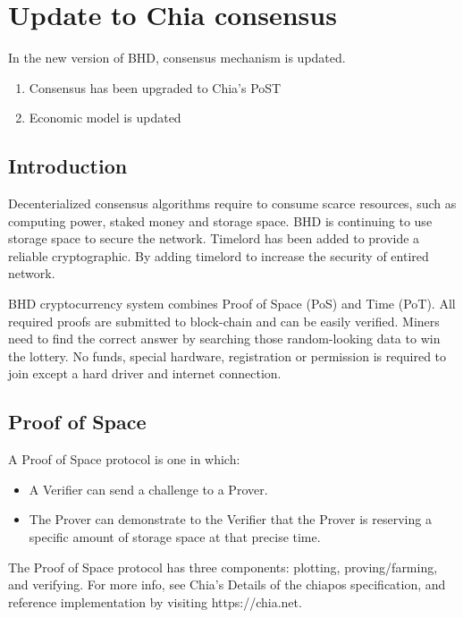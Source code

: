 \chapter{Update to Chia consensus}
\begin{flushleft}
    In the new version of BHD, consensus mechanism is updated.
    \begin{enumerate}
        \item Consensus has been upgraded to Chia's PoST
        \item Economic model is updated
    \end{enumerate}
\end{flushleft}
\section{Introduction}
\begin{flushleft}
    Decenterialized consensus algorithms require to consume scarce resources, such as computing power, staked money and storage space. BHD is continuing to use storage space to secure the network. Timelord has been added to provide a reliable cryptographic. By adding timelord to increase the security of entired network.
\end{flushleft}
\begin{flushleft}
    BHD cryptocurrency system combines Proof of Space (PoS) and Time (PoT). All required proofs are submitted to block-chain and can be easily verified. Miners need to find the correct answer by searching those random-looking data to win the lottery. No funds, special hardware, registration or permission is required to join except a hard driver and internet connection.
\end{flushleft}
\section{Proof of Space}
\begin{flushleft}
    A Proof of Space protocol is one in which:
\end{flushleft}
\begin{itemize}
    \item A Verifier can send a challenge to a Prover.
    \item The Prover can demonstrate to the Verifier that the Prover is reserving a specific amount of storage space at that precise time.
\end{itemize}
\begin{flushleft}
    The Proof of Space protocol has three components: plotting, proving/farming, and verifying. For more info, see Chia's Details of the chiapos specification, and reference implementation by visiting https://chia.net.
\end{flushleft}

